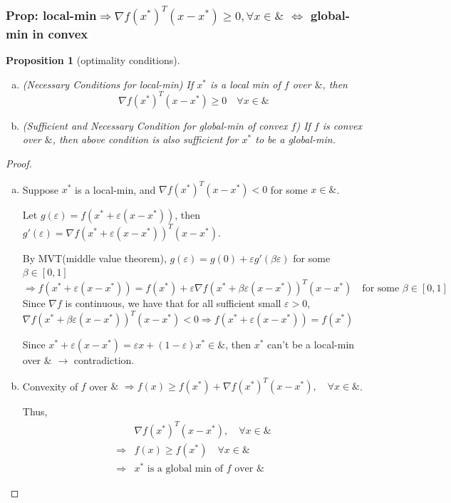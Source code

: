 \documentclass[11pt,a4paper]{article}
\newtheorem{proposition}{Proposition}
\begin{document}
\subsubsection{Prop: local-min$\Rightarrow\nabla f(x^*)^T(x-x^*)\geq 0,\forall x\in \&$ $\Leftrightarrow$ global-min in convex }
\begin{proposition}[optimality conditions]
    \quad
    \begin{enumerate}[(a)]
        \item (Necessary Conditions for local-min) If $x^*$ is a local min of $f$ over $\&$, then $$\nabla f(x^*)^T(x-x^*)\geq 0\quad \forall x\in \&$$
        \item (Sufficient and Necessary Condition for global-min of convex $f$) If $f$ is convex over $\&$, then above condition is also sufficient for $x^*$ to be a global-min.
    \end{enumerate}
\end{proposition}
\begin{proof}
    \quad
\begin{enumerate}[(a)]
    \item Suppose $x^*$ is a local-min, and $\nabla f(x^*)^T(x-x^*)<0$ for some $x\in \&$.
    
    Let $g(\varepsilon)=f(x^*+\varepsilon(x-x^*))$, then $g'(\varepsilon)=\nabla f(x^*+\varepsilon(x-x^*))^T(x-x^*)$.
    
    By MVT(middle value theorem), $g(\varepsilon)=g(0)+\varepsilon g'(\beta\varepsilon)$ for some $\beta\in[0,1]$
    $$\Rightarrow f(x^*+\varepsilon(x-x^*))=f(x^*)+\varepsilon\nabla f(x^*+\beta\varepsilon(x-x^*))^T(x-x^*)\quad \text{for some }\beta\in[0,1]$$
    Since $\nabla f$ is continuous, we have that for all sufficient small $\varepsilon>0$, $\nabla f(x^*+\beta\varepsilon(x-x^*))^T(x-x^*)<0 \Rightarrow f(x^*+\varepsilon(x-x^*))=f(x^*)$

    Since $x^*+\varepsilon(x-x^*)=\varepsilon x+(1-\varepsilon)x^*\in \&$, then $x^*$ can't be a local-min over $\&$ $\rightarrow$ contradiction.
    \item Convexity of $f$ over $\&$ $\Rightarrow f(x)\geq f(x^*)+\nabla f(x^*)^T(x-x^*),\quad \forall x\in \&$.
    
    Thus,
    \begin{equation}
        \begin{aligned}
            &\nabla f(x^*)^T(x-x^*),\quad \forall x\in \&\\
            \Rightarrow	& f(x)\geq f(x^*)\quad \forall x\in \&\\
            \Rightarrow	& x^*\text{ is a global min of $f$ over }\&
        \end{aligned}
        \nonumber
    \end{equation}
\end{enumerate}
\end{proof}
\end{document}
